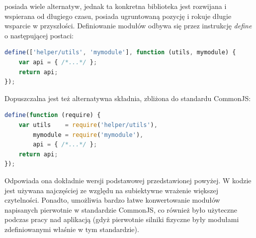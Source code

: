  posiada wiele alternatyw, jednak ta konkretna biblioteka jest
rozwijana i wspierana od długiego czasu, posiada ugruntowaną pozycję i rokuje
długie wsparcie w przyszłości. Definiowanie modułów odbywa się przez instrukcję
\emph{define} o następującej postaci:

\begin{lstlisting}[language=JavaScript, caption=Definicja modułu
przy użyciu technologii RequireJS]
define(['helper/utils', 'mymodule'], function (utils, mymodule) {
	var api = { /*...*/ };
	return api;
});
\end{lstlisting}

Dopuszczalna jest też alternatywna składnia, zbliżona do standardu CommonJS:

\begin{lstlisting}[language=JavaScript, caption=Alternatywna składnia definicji 
modułu przy użyciu technologii RequireJS]
define(function (require) {
	var utils 	 = require('helper/utils'),
		mymodule = require('mymodule'),
		api = { /*...*/ };
	return api;
});
\end{lstlisting}

Odpowiada ona dokładnie wersji podstawowej przedstawionej powyżej. W kodzie
\en jest używana najczęściej ze względu na subiektywne wrażenie większej
czytelności. Ponadto, umożliwia bardzo łatwe konwertowanie modułów napisanych
pierwotnie w standardzie CommonJS, co również było użyteczne podczas pracy nad
aplikacją \en (gdyż pierwotnie silniki fizyczne były modułami zdefiniowanymi
właśnie w tym standardzie).

